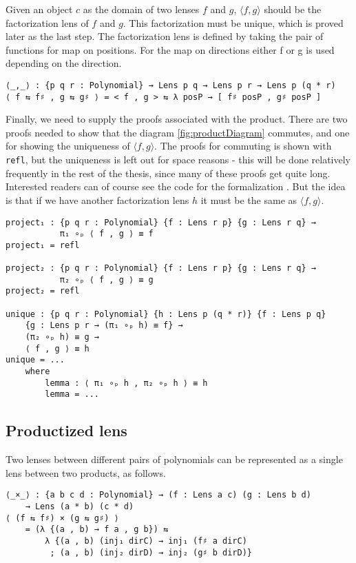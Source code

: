 Given an object $c$ as the domain of two lenses $f$ and $g$, $\langle f,g \rangle$ should be the factorization lens of $f$ and $g$. This factorization must be unique, which is proved later as the last step. The factorization lens is defined by taking the pair of functions for map on positions. For the map on directions either f or g is used depending on the direction.

\begin{verbatim}
⟨_,_⟩ : {p q r : Polynomial} → Lens p q → Lens p r → Lens p (q * r)
⟨ f ⇆ f♯ , g ⇆ g♯ ⟩ = < f , g > ⇆ λ posP → [ f♯ posP , g♯ posP ]
\end{verbatim}

Finally, we need to supply the proofs associated with the product. There are two proofs needed to show that the diagram \ref{fig:productDiagram} commutes, and one for showing the uniqueness of $\langle f,g \rangle$. The proofs for commuting is shown with \texttt{refl}, but the uniqueness is left out for space reasons - this will be done relatively frequently in the rest of the thesis, since many of these proofs get quite long. Interested readers can of course see the code for the formalization \cite{code}. But the idea is that if we have another factorization lens $h$ it must be the same as $\langle f,g \rangle$. 

\begin{verbatim}
project₁ : {p q r : Polynomial} {f : Lens r p} {g : Lens r q} →
           π₁ ∘ₚ ⟨ f , g ⟩ ≡ f
project₁ = refl

project₂ : {p q r : Polynomial} {f : Lens r p} {g : Lens r q} →
           π₂ ∘ₚ ⟨ f , g ⟩ ≡ g
project₂ = refl

unique : {p q r : Polynomial} {h : Lens p (q * r)} {f : Lens p q} 
    {g : Lens p r → (π₁ ∘ₚ h) ≡ f} →
    (π₂ ∘ₚ h) ≡ g → 
    ⟨ f , g ⟩ ≡ h
unique = ...
    where
        lemma : ⟨ π₁ ∘ₚ h , π₂ ∘ₚ h ⟩ ≡ h
        lemma = ...
\end{verbatim}

\subsection{Productized lens}
Two lenses between different pairs of polynomials can be represented as a single lens between two products, as follows.

\begin{verbatim}
⟨_×_⟩ : {a b c d : Polynomial} → (f : Lens a c) (g : Lens b d)
    → Lens (a * b) (c * d)
⟨ (f ⇆ f♯) × (g ⇆ g♯) ⟩ 
    = (λ {(a , b) → f a , g b}) ⇆
        λ {(a , b) (inj₁ dirC) → inj₁ (f♯ a dirC)
         ; (a , b) (inj₂ dirD) → inj₂ (g♯ b dirD)}
\end{verbatim}

